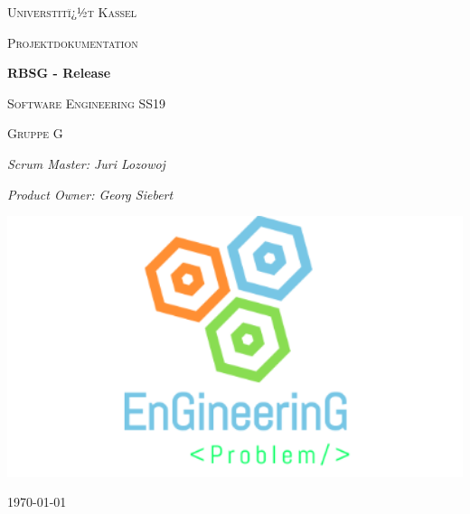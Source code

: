 \documentclass[12pt, titlepage]{scrartcl}
\newcommand{\RN}[1]{%
	\textup{\uppercase\expandafter{\romannumeral#1}}%
}
\begin{document}
	\begin{titlepage}
		\centering
		{\scshape\LARGE Universtitï¿½t Kassel \par}
		\vspace{1cm}
		{\scshape\Large Projektdokumentation\par}
		\vspace{1.5cm}
		{\huge\bfseries RBSG - Release \RN{2}\par}
		\vspace{2cm}
		{\scshape\Large Software Engineering \RN{1} SS19\par}
		\vspace{0.5cm}
		{\scshape\Large Gruppe G\par}
		\vspace{0.5cm}
		{\Large\itshape Scrum Master: Juri Lozowoj\par}
		\vspace{0.5cm}
		{\Large\itshape Product Owner: Georg Siebert\par}
		\vspace{2cm}
		{\includegraphics[width=1\textwidth]{Logo.png}\par}
		\vfill
	\vfill
	
	{\large \today\par}
	\end{titlepage}
	\begin{abstract}
		Diese Dokumentation beschreibt das zweite Release des Projektes RBSG von Team G. Dies umfasst die Auflistung und Erlï¿½uterung der Mockups und der Domain Stories. Beide Sprints werden dokumentiert und analysiert. Zum Schluss wird das Resultat des Releases mit den Zielen verglichen und es wird auf  Probleme oder nicht erfï¿½llte Anforderungen eingegangen.
	\end{abstract}
	\tableofcontents
	\newpage
	\setcounter{page}{1}
\end{document}
